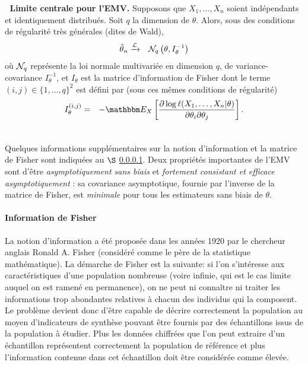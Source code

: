 \begin{theorem}{\bf $ \ $ Limite centrale pour l'EMV.}\label{tlc.mle} 
Supposons que $X_1,\ldots,X_n$ soient in\-d\'ependants et identiquement distribu\'es. Soit $q$ la dimension de $\theta$. Alors, sous des conditions de r\'egularit\'e tr\`es g\'en\'erales (dites de Wald),
\begin{eqnarray}
\hat{\theta}_n  & \xrightarrow{{\cal{L}}} & {\cal{N}}_q\left(\theta,I^{-1}_{\theta}\right) \label{LLN.MLE}
\end{eqnarray}
o\`u ${\cal{N}}_q$ repr\'esente la loi normale multivari\'ee en dimension $q$, de variance-covariance $I^{-1}_{\theta}$, et $I_{\theta}$ est la matrice d'information de Fisher    dont le terme $(i,j)\in\{1,\ldots,q\}^2$ est d\'efini par (sous ces m\^emes conditions de r\'egularit\'e)
\begin{eqnarray}
I^{(i,j)}_{\theta} & = & -\E_X\left[\frac{\partial \log\ell(X_1,\ldots,X_n|\theta)}{\partial \theta_i\partial\theta_j}\right]. \label{info.fisher}\\
\nonumber
\end{eqnarray} 
\end{theorem}

Quelques informations suppl\'ementaires sur la notion d'information et la matrice de Fisher sont indiqu\'ees au $\S$ \ref{info.fisher}. Deux propri\'et\'es importantes de l'EMV sont d'\^etre {\it asymptotiquement sans biais} et {\it fortement consistant et efficace asymptotiquement} : sa covariance asymptotique, fournie par l'inverse de la matrice de Fisher, est {\it minimale} pour tous les estimateurs sans biais de $\theta$.  

\paragraph{Information de Fisher}\label{info.fisher}

La notion d'information a \'et\'e propos\'ee dans les ann\'ees 1920 par le chercheur anglais Ronald A. Fisher (consid\'er\'e comme le p\`ere de la statistique math\'ematique). La d\'emarche de Fisher est la suivante: si l'on s'int\'eresse aux caract\'eristiques d'une population nombreuse (voire infinie, qui est le cas limite auquel on est  ramen\'e en permanence), on ne peut ni conna\^itre ni traiter les informations trop abondantes relatives \`a chacun des individus qui la composent. Le probl\`eme devient donc d'\^etre capable de d\'ecrire correctement la population au moyen d'indicateurs de synth\`ese pouvant \^etre fournis par des \'echantillons issus de la population \`a \'etudier. Plus les donn\'ees chiffr\'ees que l'on peut extraire d'un \'echantillon repr\'esentent correctement la population de r\'ef\'erence et plus l'information contenue dans cet \'echantillon doit \^etre consid\'er\'ee comme \'elev\'ee. \\

